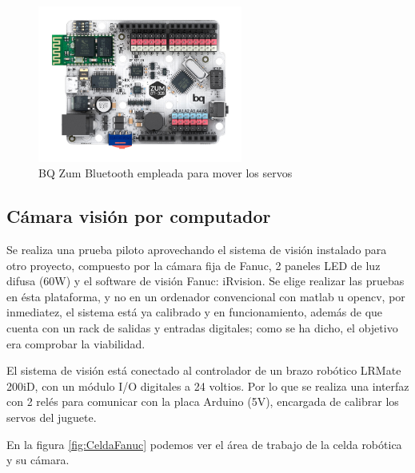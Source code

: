 \begin{figure}
\centering
\includegraphics[width=0.6\textwidth]{Figures/BQZUM}
\caption[BQ Zum Bluetooth empleada para mover los servos]{BQ Zum Bluetooth empleada para mover los servos}
\label{fig:BQZUM}
\end{figure}


\subsection{Cámara visión por computador}

Se realiza una prueba piloto aprovechando el sistema de visión instalado para otro proyecto, compuesto por la cámara fija de Fanuc, 2 paneles LED de luz difusa (60W) y el software de visión Fanuc: iRvision. Se elige realizar las pruebas en ésta plataforma, y no en un ordenador convencional con matlab u opencv, por inmediatez, el sistema está ya calibrado y en funcionamiento, además de que cuenta con un rack de salidas y entradas digitales; como se ha dicho, el objetivo era comprobar la viabilidad.

El sistema de visión está conectado al controlador de un brazo robótico LRMate 200iD, con un módulo I/O digitales a 24 voltios. Por lo que se realiza una interfaz con 2 relés para comunicar con la placa Arduino (5V), encargada de calibrar los servos del juguete.

En la figura \ref{fig:CeldaFanuc} podemos ver el área de trabajo de la celda robótica y su cámara.

